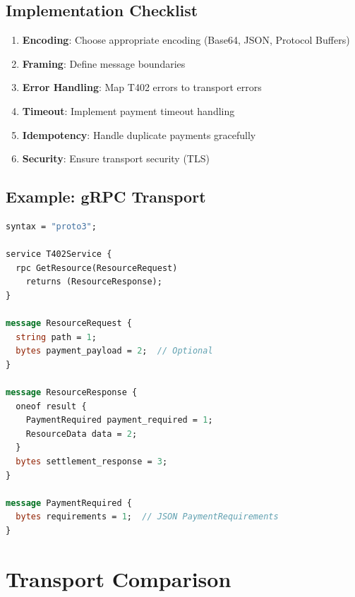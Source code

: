 \subsection{Implementation Checklist}

\begin{enumerate}
    \item \textbf{Encoding}: Choose appropriate encoding (Base64, JSON, Protocol Buffers)
    \item \textbf{Framing}: Define message boundaries
    \item \textbf{Error Handling}: Map T402 errors to transport errors
    \item \textbf{Timeout}: Implement payment timeout handling
    \item \textbf{Idempotency}: Handle duplicate payments gracefully
    \item \textbf{Security}: Ensure transport security (TLS)
\end{enumerate}

\subsection{Example: gRPC Transport}

\begin{lstlisting}[language=protobuf,caption={gRPC service definition}]
syntax = "proto3";

service T402Service {
  rpc GetResource(ResourceRequest)
    returns (ResourceResponse);
}

message ResourceRequest {
  string path = 1;
  bytes payment_payload = 2;  // Optional
}

message ResourceResponse {
  oneof result {
    PaymentRequired payment_required = 1;
    ResourceData data = 2;
  }
  bytes settlement_response = 3;
}

message PaymentRequired {
  bytes requirements = 1;  // JSON PaymentRequirements
}
\end{lstlisting}

\section{Transport Comparison}
\label{sec:transport-comparison}

